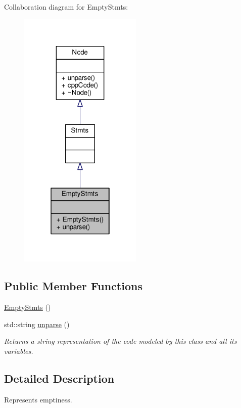 Collaboration diagram for Empty\-Stmts\-:\nopagebreak
\begin{figure}[H]
\begin{center}
\leavevmode
\includegraphics[width=166pt]{classEmptyStmts__coll__graph}
\end{center}
\end{figure}
\subsection*{Public Member Functions}
\begin{DoxyCompactItemize}
\item 
\hyperlink{classEmptyStmts_aec1fdeb62d294b8fedf55ff234fcacf5}{Empty\-Stmts} ()
\item 
std\-::string \hyperlink{classEmptyStmts_a0f5a1640891e7c70f8ac38d6df031f0e}{unparse} ()
\begin{DoxyCompactList}\small\item\em Returns a string representation of the code modeled by this class and all its variables. \end{DoxyCompactList}\end{DoxyCompactItemize}


\subsection{Detailed Description}
Represents emptiness. 

